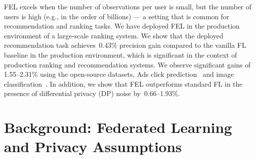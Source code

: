 \documentclass{article}
\newcommand{\il}[1]{\sethlcolor{yellow}\hl{[Ilias: #1]}}
\begin{document}
FEL excels when the number of observations per user is small, but the number of users is high (e.g., in the order of billions) --- a setting that is common for recommendation and ranking tasks.
We have deployed FEL in the production environment of a large-scale ranking system. We show that the deployed recommendation task achieves~0.43\% precision gain compared to the vanilla FL baseline in the production environment, which is significant in the context of production ranking and recommendation systems. %
We observe significant gains of 1.55--2.31\% using the open-source datasets, Ads click prediction~\cite{Mani-taobao} and image classification~\cite{Mani-liu2015deep}.
In addition, we show that FEL outperforms standard FL in the presence of differential privacy (DP) noise by~0.66--1.93\%.






\section{Background: Federated Learning and Privacy Assumptions}
\vspace{-0.25cm}

\end{document}

